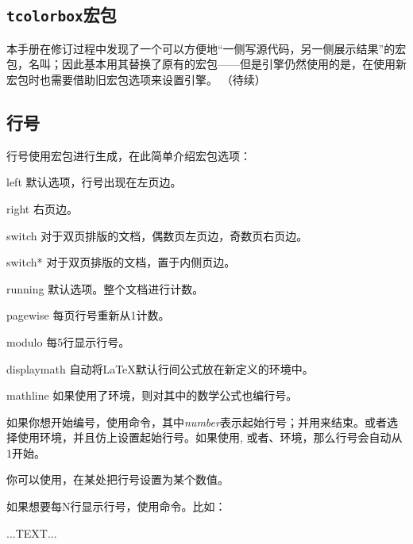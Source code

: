 \subsection{\texttt{tcolorbox}宏包}
\label{subsec:tcolorbox}
本手册在修订过程中发现了一个可以方便地“一侧写源代码，另一侧展示结果”的宏包，名叫；因此基本用其替换了原有的宏包——但是引擎仍然使用的是，在使用新宏包时也需要借助旧宏包选项来设置引擎。
（待续）

\subsection{行号}
\begin{linenumbers}
\modulolinenumbers[3]
行号使用宏包进行生成，在此简单介绍宏包选项：
\begin{para}
  \item[left]默认选项，行号出现在左页边。
  \item[right]右页边。
  \item[switch]对于双页排版的文档，偶数页左页边，奇数页右页边。
  \item[switch*]对于双页排版的文档，置于内侧页边。
  \item[running]默认选项。整个文档进行计数。
  \item[pagewise]每页行号重新从1计数。
  \item[modulo]每5行显示行号。
  \item[displaymath]自动将\LaTeX 默认行间公式放在新定义的环境中。
  \item[mathline]如果使用了环境，则对其中的数学公式也编行号。
\end{para}

如果你想开始编号，使用命令，其中\textit{number}表示起始行号；并用来结束。或者选择使用环境，并且仿上设置起始行号。如果使用, 或者、环境，那么行号会自动从1开始。

你可以使用，在某处把行号设置为某个数值。

如果想要每N行显示行号，使用命令。比如：
\end{linenumbers}

\begin{latex}
\begin{linenumbers}
    \modulolinenumbers[3]
    ...TEXT...
\end{linenumbers}
\end{latex}


